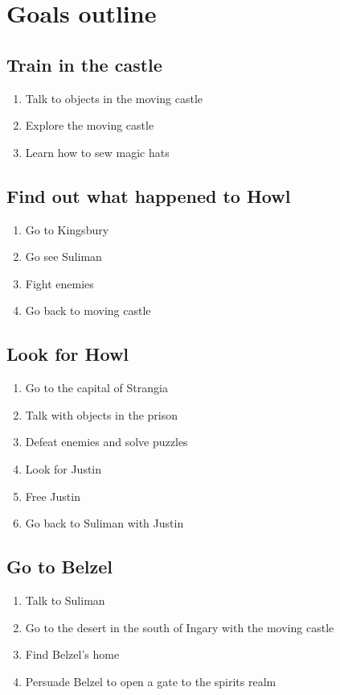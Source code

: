 \section{Goals outline}

\subsection{Train in the castle}
\begin{enumerate}
\item Talk to objects in the moving castle
\item Explore the moving castle
\item Learn how to sew magic hats
\end{enumerate}

\subsection{Find out what happened to Howl}
\begin{enumerate}
\item Go to Kingsbury
\item Go see Suliman
\item Fight enemies
\item Go back to moving castle
\end{enumerate}

\subsection{Look for Howl}
\begin{enumerate}
\item Go to the capital of Strangia
\item Talk with objects in the prison
\item Defeat enemies and solve puzzles
\item Look for Justin
\item Free Justin
\item Go back to Suliman with Justin
\end{enumerate}

\subsection{Go to Belzel}
\begin{enumerate}
\item Talk to Suliman
\item Go to the desert in the south of Ingary with the moving castle
\item Find Belzel’s home
\item Persuade Belzel to open a gate to the spirits realm
\end{enumerate}

